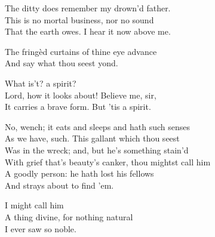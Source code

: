 \begin{verse_speech}[Ferdinand] 
The ditty does remember my drown'd father.\\
This is no mortal business, nor no sound\\
That the earth owes. I hear it now above me.\\
\end{verse_speech}



\begin{verse_speech}[Prospero] 
The fringèd curtains of thine eye advance\\
And say what thou seest yond.
\end{verse_speech}

\begin{verse_speech}[Miranda] 
What is't? a spirit?\\
Lord, how it looks about! Believe me, sir,\\
It carries a brave form. But 'tis a spirit.
\end{verse_speech}



\begin{verse_speech}[Prospero] 
No, wench; it eats and sleeps and hath such senses\\
As we have, such. This gallant which thou seest\\
Was in the wreck; and, but he's something stain'd\\
With grief that's beauty's canker, thou mightst call him\\
A goodly person: he hath lost his fellows\\
And strays about to find 'em.
\end{verse_speech}

\begin{verse_speech}[Miranda] 
I might call him\\
A thing divine, for nothing natural\\
I ever saw so noble.
\end{verse_speech}

\begin{verse_speech}[Prospero]
\end{verse_speech}


